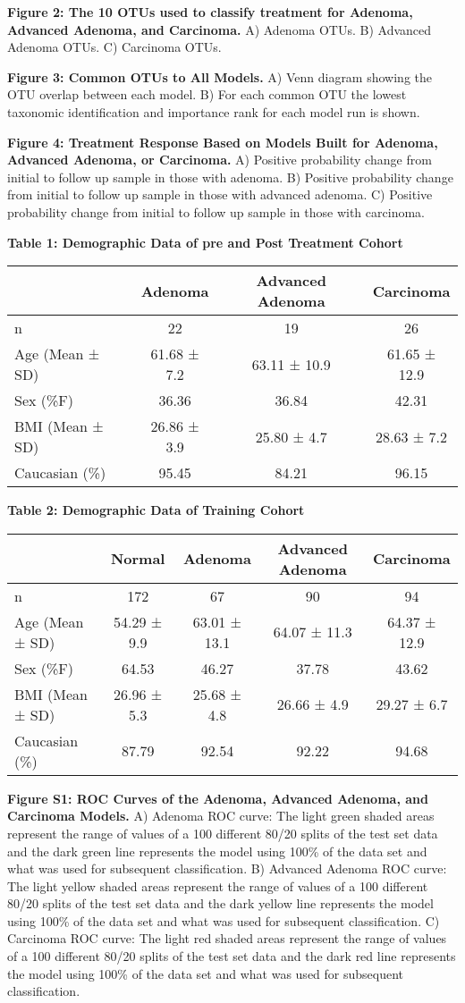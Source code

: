 \documentclass[12pt,]{article}
\begin{document}
\textbf{Figure 2: The 10 OTUs used to classify treatment for Adenoma,
Advanced Adenoma, and Carcinoma.} A) Adenoma OTUs. B) Advanced Adenoma
OTUs. C) Carcinoma OTUs.

\textbf{Figure 3: Common OTUs to All Models.} A) Venn diagram showing
the OTU overlap between each model. B) For each common OTU the lowest
taxonomic identification and importance rank for each model run is
shown.

\textbf{Figure 4: Treatment Response Based on Models Built for Adenoma,
Advanced Adenoma, or Carcinoma.} A) Positive probability change from
initial to follow up sample in those with adenoma. B) Positive
probability change from initial to follow up sample in those with
advanced adenoma. C) Positive probability change from initial to follow
up sample in those with carcinoma.

\newpage

\textbf{Table 1: Demographic Data of pre and Post Treatment Cohort}

\begin{longtable}[]{@{}lccc@{}}
\toprule
& Adenoma & Advanced Adenoma & Carcinoma\tabularnewline
\midrule
\endhead
n & 22 & 19 & 26\tabularnewline
Age (Mean ± SD) & 61.68 ± 7.2 & 63.11 ± 10.9 & 61.65 ±
12.9\tabularnewline
Sex (\%F) & 36.36 & 36.84 & 42.31\tabularnewline
BMI (Mean ± SD) & 26.86 ± 3.9 & 25.80 ± 4.7 & 28.63 ± 7.2\tabularnewline
Caucasian (\%) & 95.45 & 84.21 & 96.15\tabularnewline
\bottomrule
\end{longtable}

\newpage

\textbf{Table 2: Demographic Data of Training Cohort}

\begin{longtable}[]{@{}lcccc@{}}
\toprule
& Normal & Adenoma & Advanced Adenoma & Carcinoma\tabularnewline
\midrule
\endhead
n & 172 & 67 & 90 & 94\tabularnewline
Age (Mean ± SD) & 54.29 ± 9.9 & 63.01 ± 13.1 & 64.07 ± 11.3 & 64.37 ±
12.9\tabularnewline
Sex (\%F) & 64.53 & 46.27 & 37.78 & 43.62\tabularnewline
BMI (Mean ± SD) & 26.96 ± 5.3 & 25.68 ± 4.8 & 26.66 ± 4.9 & 29.27 ±
6.7\tabularnewline
Caucasian (\%) & 87.79 & 92.54 & 92.22 & 94.68\tabularnewline
\bottomrule
\end{longtable}

\newpage

\textbf{Figure S1: ROC Curves of the Adenoma, Advanced Adenoma, and
Carcinoma Models.} A) Adenoma ROC curve: The light green shaded areas
represent the range of values of a 100 different 80/20 splits of the
test set data and the dark green line represents the model using 100\%
of the data set and what was used for subsequent classification. B)
Advanced Adenoma ROC curve: The light yellow shaded areas represent the
range of values of a 100 different 80/20 splits of the test set data and
the dark yellow line represents the model using 100\% of the data set
and what was used for subsequent classification. C) Carcinoma ROC curve:
The light red shaded areas represent the range of values of a 100
different 80/20 splits of the test set data and the dark red line
represents the model using 100\% of the data set and what was used for
subsequent classification.
\end{document}
